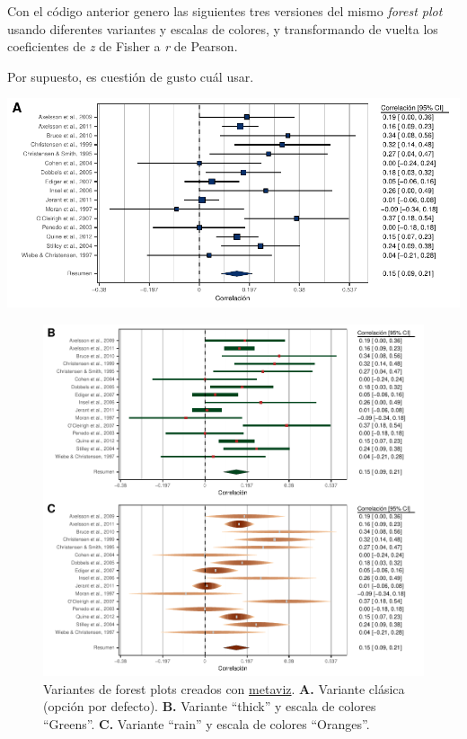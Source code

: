 \documentclass[
  bookmarksnumbered]{article}
\begin{document}
Con el código anterior genero las siguientes tres versiones del mismo \emph{forest plot} usando diferentes variantes y escalas de colores, y transformando de vuelta los coeficientes de \emph{z} de Fisher a \emph{r} de Pearson.

Por supuesto, es cuestión de gusto cuál usar.

\includegraphics{Meta-analysis_files/figure-latex/for-plot3-1.pdf}

\begin{figure}
\centering
\includegraphics{Meta-analysis_files/figure-latex/for-plot3b-1.pdf}
\caption{\label{fig:for-plot3b}Variantes de forest plots creados con \href{https://cran.r-project.org/web/packages/metaviz/vignettes/metaviz.html}{metaviz}. \textbf{A.} Variante clásica (opción por defecto). \textbf{B.} Variante ``thick'' y escala de colores ``Greens''. \textbf{C.} Variante ``rain'' y escala de colores ``Oranges''.}
\end{figure}
\end{document}
